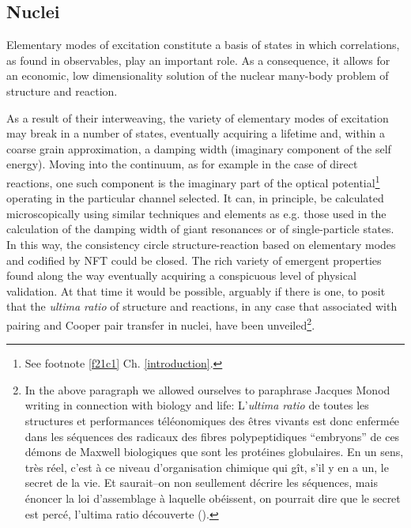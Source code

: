 \subsection{Nuclei}\label{S4.A.1}
Elementary modes of excitation constitute a basis of states in which correlations, as found in observables, play an important role. As a consequence, it allows for an economic, low dimensionality solution of the nuclear many-body problem of structure and reaction.


As a result of their interweaving,  the variety of elementary modes of excitation may break in a number of states, eventually acquiring a lifetime and, within a coarse grain approximation, a damping width (imaginary component of the self energy). Moving into the continuum, as for example in the case of direct reactions, one such component is the imaginary part of the optical potential\footnote{See footnote \ref{f21c1} Ch. \ref{introduction}.} operating in the particular channel selected. It can, in principle, be calculated microscopically using similar techniques and elements as e.g. those used in the calculation of the damping width of giant resonances or of single-particle states. In this way, the consistency circle structure-reaction based on elementary modes and codified by NFT could be closed. The rich variety of emergent properties found along the way eventually acquiring a conspicuous level of physical validation. At that time it would be possible, arguably if there is one, to posit that the \textit{ultima ratio} of structure and reactions, in any case that associated with pairing and Cooper pair transfer in nuclei, have been unveiled\footnote{In the above paragraph we allowed ourselves to paraphrase Jacques Monod writing in connection with biology and life: L'\textit{ultima ratio} de toutes les structures et performances t\'el\'eonomiques des \^etres vivants est donc enferm\'ee dans les s\'equences des radicaux des fibres polypeptidiques ``embryons'' de ces d\'emons de Maxwell biologiques que sont les prot\'eines globulaires. En un sens, tr\`{e}s r\'{e}el, c'est \`a ce niveau d'organisation chimique qui g\^it, s'il y en a un, le secret de la vie. Et saurait--on non seullement d\'ecrire les s\'equences, mais \'enoncer la loi d'assemblage \`a laquelle ob\'eissent, on pourrait dire que le secret est perc\'e, l'ultima ratio d\'ecouverte (\cite{Monod:70}).}.
